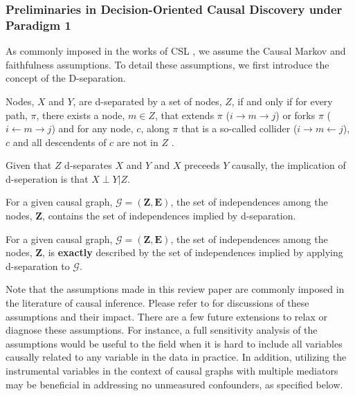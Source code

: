 

\subsubsection{Preliminaries in Decision-Oriented Causal Discovery under Paradigm 1}\label{sec:assum_csl}

As commonly imposed in the works of \acrshort{CSL} \citep[e.g.,][]{spirtes2000causation,peters2014causal}, we assume the Causal Markov and faithfulness %
assumptions. To detail these assumptions, we first introduce the concept of the D-separation.
\begin{definition}[D-separation]\label{def-d-sep}
Nodes, $X$ and $Y$, are d-separated by a set of nodes, $Z$, if and only if for every path, $\pi$, there exists a node, $m\in Z$, that extends $\pi$ ($i\to m\to j$) or forks $\pi$ ($i\xleftarrow{} m\to j$) and for any node, $c$, along $\pi$ that is a so-called collider ($i\to m\xleftarrow{} j$), $c$ and all descendents of $c$ are not in $Z$ \citep{pearl2009causal}.
\end{definition}
Given that $Z$ d-separates $X$ and $Y$ and $X$ preceeds $Y$ causally, the implication of d-seperation is that $X\perp Y|Z$.
\begin{assumption}
For a given causal graph, $\mathcal{G} =(\mathbf{Z},\mathbf{E})$, the set of independences among the nodes, $\mathbf{Z}$, contains the set of independences implied by d-separation.
\end{assumption}
\begin{assumption}
For a given causal graph, $\mathcal{G} =(\mathbf{Z},\mathbf{E})$, the set of independences among the nodes, $\mathbf{Z}$, is \textbf{exactly} described by the set of independences implied by applying d-separation to $\mathcal{G}$.
\end{assumption}

Note that the assumptions made in this review paper are commonly imposed in the literature of causal inference. Please refer to \cite{pearl2000causality, pearl2009causal, athey2015machine, nandy2017estimating, wager2018estimation, kunzel2019metalearners, nie2021quasi} for discussions of these assumptions and their impact. There are a few future extensions to relax or diagnose these assumptions. For instance, a full sensitivity analysis of the assumptions would be useful to the field when it is hard to include all variables causally related to any variable in the data in practice. In addition, utilizing the instrumental variables in the context of causal graphs with multiple mediators may be beneficial in addressing no unmeasured confounders, as specified below.

